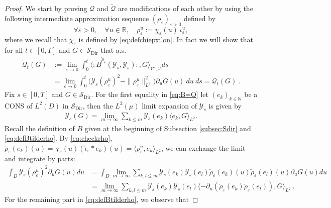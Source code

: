 \documentclass[a4paper, reqno, 12pt]{amsart}
\theoremstyle{plain}
\theoremstyle{definition}
\newcommand{\R}{\mathbb{R}}
\newcommand{\N}{\mathbb{N}}
\newcommand{\Sdir}{\mathcal{S}_{\text{Dir}}}
\begin{document}
\begin{proof}
    We start by proving $\mathcal Q$ and $\tilde{\mathcal Q}$ are modifications of each other by using the following intermediate approximation sequence $(\rho_\varepsilon)_{\varepsilon>0}$ defined by     \begin{equation}
     \label{eq:def_rhovarepsilon}
    \forall \varepsilon>0, \quad \forall u \in \R, \quad  \rho_{\varepsilon}^u := \chi_{\varepsilon}(u)\ \iota^u_{\varepsilon},
    \end{equation}
    where we recall that $\chi_\varepsilon$ is defined by \eqref{eq:defchiepxilon}.  In fact we will show that for all $t\in[0,T]$ and $G\in \Sdir$ that a.s.
    \begin{align} \label{eq:B=Q}
        \tilde{\mathcal Q}_t(G) &:= \lim_{\varepsilon\to 0} \int_0^t \langle :\!\tilde{B}^{\check\rho_\varepsilon}(\mathcal{Y}_s,\mathcal{Y}_s)\!:, G\rangle_{\mathcal V',\mathcal V} ds  \\
        & = \lim_{\varepsilon \to 0}\int_0^t \big(\mathcal{Y}_s(\rho_{\varepsilon}^u)^2-\|\rho^u_{\varepsilon}\|^2_{L^2}\big)\partial_uG(u) \ du\ ds= \mathcal{Q}_t(G) \ . 
    \end{align}
     Fix $s\in[0,T]$ and $G\in\Sdir$. For the first equality in \eqref{eq:B=Q} let $(e_k)_{k\in\N}$ be a CONS of $L^2(D)$ in $\Sdir$, then the $L^2(\mu)$ limit expansion of $\mathcal Y_s$ is given by 
    \begin{align*}
        \mathcal{Y}_s(G) = \lim_{m\to\infty} \sum_{k\leq m} \mathcal{Y}_s(e_k) \langle e_k ,G\rangle_{L^2}.
    \end{align*}
    Recall the definition of $B$ given at the beginning of Subsection \ref{subsec:Sdir}   and \eqref{eq:defBtilderho}. By \eqref{eq:checkrho}, $\check\rho_{\varepsilon}(e_k)(u) =\chi_{\varepsilon}(u) (\check\iota_{\varepsilon} \ast e_k)(u) = \langle\rho^u_{\varepsilon},e_k\rangle_{L^2}$, we can exchange the limit and integrate by parts:
    \begin{align*}
        \int_{D} \mathcal{Y}_s(\rho^u_{\varepsilon})^2 \partial_u G(u) du &= \int_{D}  \lim_{m\to\infty} \sum_{k,l\leq m} \mathcal{Y}_s(e_k)\mathcal{Y}_s(e_l) \check\rho_{\varepsilon}(e_k)(u)\check\rho_{\varepsilon}(e_l)(u)\partial_u G(u) du \\
        & = \lim_{m\to\infty} \sum_{k,l\leq m}   \mathcal{Y}_s(e_k)\mathcal{Y}_s(e_l) \langle -\partial_u (\check\rho_{\varepsilon}(e_k)\check\rho_{\varepsilon}(e_l)),G \rangle_{L^2} \ .
    \end{align*}
For the remaining part in \eqref{eq:defBtilderho}, we observe that

\end{proof}
\end{document}
